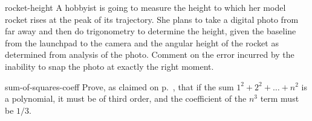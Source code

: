 \begin{hwsection}
\begin{hwwithsoln}{rocket-height}
A hobbyist is going to measure the height to which her model rocket rises at the peak of
its trajectory. She plans to
take a digital photo from far away and then do trigonometry to determine the height,
given the baseline from the launchpad to the camera and the angular height of the rocket
as determined from analysis of the photo. Comment on the error incurred by the inability to
snap the photo at exactly the right moment.
\end{hwwithsoln}

\begin{hwwithsoln}{sum-of-squares-coeff}
Prove, as claimed on p.~\pageref{claim-sum-of-squares-coeff}, that
if the sum $1^2+2^2+\ldots+n^2$ is a polynomial, it must be of third
order, and the coefficient of the $n^3$ term must be $1/3$.
\end{hwwithsoln}


\end{hwsection}
